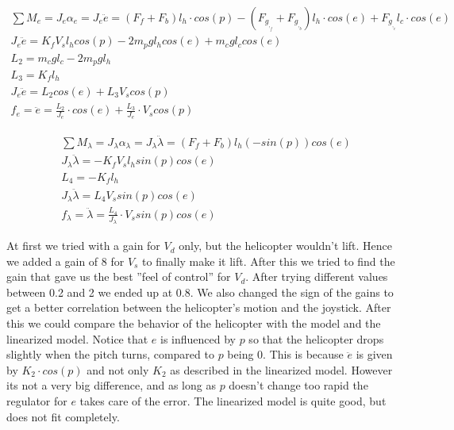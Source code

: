 \begin{equations}
    \begin{gather}
       \sum M_e = J_e\alpha_e = J_e\ddot{e}= (F_f+F_b)l_h \cdot cos(p) - (F_g_,_f+F_g_,_b)l_h\cdot cos(e)+F_g_,_cl_c\cdot cos(e) \nonumber \\
       J_e\ddot{e}=K_fV_sl_hcos(p)-2m_pgl_hcos(e)+m_cgl_ccos(e) \nonumber \\
       L_2=m_cgl_c-2m_pgl_h \nonumber \\
       L_3=K_fl_h \nonumber \\
       J_e\ddot{e}=L_2cos(e)+L_3V_scos(p) \label{eq: 2} \\
       f_e = \ddot{e} = \frac{L_2}{J_e} \cdot cos(e) + \frac{L_3}{J_e} \cdot V_s cos(p) \label{eq: fe}
    \end{gather}
\end{equations}

\begin{equations}
    \begin{gather}
        \sum M_\lambda=J_\lambda\alpha_\lambda=J_\lambda\ddot{\lambda}=(F_f+F_b)l_h(-sin(p))cos(e) \nonumber \\
        J_\lambda\ddot{\lambda}=-K_fV_sl_hsin(p)cos(e) \nonumber \\
        L_4=-K_fl_h \nonumber \\
        J_\lambda\ddot{\lambda}=L_4V_ssin(p)cos(e) \label{eq: 3} \\
        f_\lambda = \ddot{\lambda} = \frac{L_4}{J_\lambda} \cdot V_s sin(p)cos(e) \label{eq: fl}
    \end{gather}
\end{equations}

\newline
\newline

At first we tried with a gain for $V_d$ only, but the helicopter wouldn't lift. Hence we added a gain of 8 for $V_s$ to finally make it lift. After this we tried to find the gain that gave us the best ''feel of control'' for $V_d$. After trying different values between 0.2 and 2 we ended up at 0.8. We also changed the sign of the gains to get a better correlation between the helicopter's motion and the joystick.  
After this we could compare the behavior of the helicopter with the model and the linearized model. Notice that $e$ is influenced by $p$ so that the helicopter drops slightly when the pitch turns, compared to $p$ being 0. This is because $\ddot{e}$ is given by $K_2 \cdot cos(p)$ and not only $K_2$ as described in the linearized model. However its not a very big difference, and as long as $p$ doesn't change too rapid the regulator for $e$ takes care of the error. The linearized model is quite good, but does not fit completely. 


